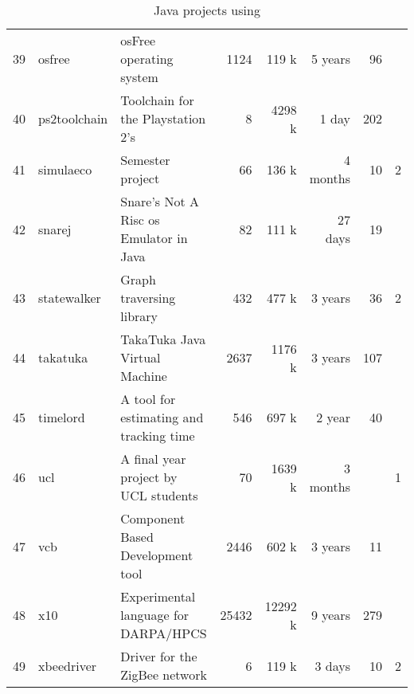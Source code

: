 \begin{table}[htb]
{\begin{minipage}{\textwidth}
\begin{tabularx}{\textwidth}{|r|l|X|r|r|r|r|r|}
  39 & osfree & osFree operating system   & 1124 & 119 k & 5 years &  96 & \\ 
  40 & ps2toolchain & Toolchain for the Playstation 2's   &   8 & 4298 k &  1 day & 202 & \\ 
  41 & simulaeco & Semester project  &  66 & 136 k &  4 months  &  10 & 2 \\ 
  42 & snarej & Snare's Not A Risc os Emulator in Java  &  82 & 111 k &  27 days &  19 & \\ 
  43 & statewalker & Graph traversing library   & 432 & 477 k & 3 years &  36 & 2 \\ 
  44 & takatuka & TakaTuka Java Virtual Machine   & 2637 & 1176 k & 3 years & 107 & \\ 
  45 & timelord & A tool for estimating and tracking time   & 546 & 697 k &  2 year &  40 & \\ 
  46 & ucl & A final year project by UCL students &  70 & 1639 k &  3 months & & 1 \\ 
  47 & vcb & Component Based Development tool   & 2446 & 602 k & 3 years &  11 & \\ 
  48 & x10 & Experimental language for DARPA/HPCS   & 25432 & 12292 k & 9 years & 279 & \\ 
  49 & xbeedriver & Driver for the ZigBee network  &   6 & 119 k &  3 days &  10 & 2\\ 
  \hline
\end{tabularx}

\end{minipage}
}

\caption{Java projects using \smu{}}  \label{table:projects}
\end{table}
